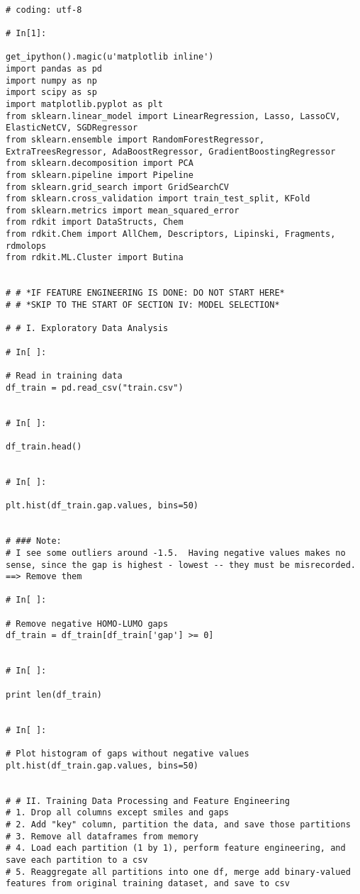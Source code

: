 \documentclass[11pt, oneside]{article}   	%
\begin{document}
\begin{lstlisting}

# coding: utf-8

# In[1]:

get_ipython().magic(u'matplotlib inline')
import pandas as pd
import numpy as np
import scipy as sp
import matplotlib.pyplot as plt
from sklearn.linear_model import LinearRegression, Lasso, LassoCV, ElasticNetCV, SGDRegressor
from sklearn.ensemble import RandomForestRegressor, ExtraTreesRegressor, AdaBoostRegressor, GradientBoostingRegressor
from sklearn.decomposition import PCA
from sklearn.pipeline import Pipeline
from sklearn.grid_search import GridSearchCV
from sklearn.cross_validation import train_test_split, KFold
from sklearn.metrics import mean_squared_error
from rdkit import DataStructs, Chem
from rdkit.Chem import AllChem, Descriptors, Lipinski, Fragments, rdmolops
from rdkit.ML.Cluster import Butina


# # *IF FEATURE ENGINEERING IS DONE: DO NOT START HERE*
# # *SKIP TO THE START OF SECTION IV: MODEL SELECTION*

# # I. Exploratory Data Analysis

# In[ ]:

# Read in training data
df_train = pd.read_csv("train.csv")


# In[ ]:

df_train.head()


# In[ ]:

plt.hist(df_train.gap.values, bins=50)


# ### Note: 
# I see some outliers around -1.5.  Having negative values makes no sense, since the gap is highest - lowest -- they must be misrecorded.  ==> Remove them

# In[ ]:

# Remove negative HOMO-LUMO gaps
df_train = df_train[df_train['gap'] >= 0]


# In[ ]:

print len(df_train)


# In[ ]:

# Plot histogram of gaps without negative values
plt.hist(df_train.gap.values, bins=50)


# # II. Training Data Processing and Feature Engineering
# 1. Drop all columns except smiles and gaps
# 2. Add "key" column, partition the data, and save those partitions
# 3. Remove all dataframes from memory
# 4. Load each partition (1 by 1), perform feature engineering, and save each partition to a csv
# 5. Reaggregate all partitions into one df, merge add binary-valued features from original training dataset, and save to csv


\end{lstlisting}
\end{document}
